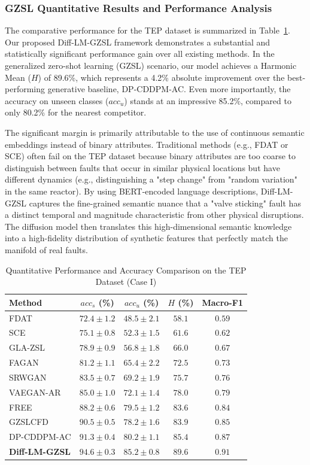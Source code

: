 \documentclass[journal]{IEEEtran}
\begin{document}
\subsubsection{GZSL Quantitative Results and Performance Analysis}
The comparative performance for the TEP dataset is summarized in Table~\ref{tab:tep_results}. Our proposed Diff-LM-GZSL framework demonstrates a substantial and statistically significant performance gain over all existing methods. In the generalized zero-shot learning (GZSL) scenario, our model achieves a Harmonic Mean ($H$) of 89.6\%, which represents a 4.2\% absolute improvement over the best-performing generative baseline, DP-CDDPM-AC. Even more importantly, the accuracy on unseen classes ($acc_u$) stands at an impressive 85.2\%, compared to only 80.2\% for the nearest competitor.

The significant margin is primarily attributable to the use of continuous semantic embeddings instead of binary attributes. Traditional methods (e.g., FDAT or SCE) often fail on the TEP dataset because binary attributes are too coarse to distinguish between faults that occur in similar physical locations but have different dynamics (e.g., distinguishing a "step change" from "random variation" in the same reactor). By using BERT-encoded language descriptions, Diff-LM-GZSL captures the fine-grained semantic nuance that a "valve sticking" fault has a distinct temporal and magnitude characteristic from other physical disruptions. The diffusion model then translates this high-dimensional semantic knowledge into a high-fidelity distribution of synthetic features that perfectly match the manifold of real faults.

\begin{table}[htbp]
\centering
\caption{Quantitative Performance and Accuracy Comparison on the TEP Dataset (Case I)}
\label{tab:tep_results}
\begin{tabular}{lcccc}
\toprule
Method & $acc_s$ (\%) & $acc_u$ (\%) & $H$ (\%) & Macro-F1 \\
\midrule
FDAT & $72.4 \pm 1.2$ & $48.5 \pm 2.1$ & $58.1$ & $0.59$ \\
SCE & $75.1 \pm 0.8$ & $52.3 \pm 1.5$ & $61.6$ & $0.62$ \\
GLA-ZSL & $78.9 \pm 0.9$ & $56.8 \pm 1.8$ & $66.0$ & $0.67$ \\
FAGAN & $81.2 \pm 1.1$ & $65.4 \pm 2.2$ & $72.5$ & $0.73$ \\
SRWGAN & $83.5 \pm 0.7$ & $69.2 \pm 1.9$ & $75.7$ & $0.76$ \\
VAEGAN-AR & $85.0 \pm 1.0$ & $72.1 \pm 1.4$ & $78.0$ & $0.79$ \\
FREE & $88.2 \pm 0.6$ & $79.5 \pm 1.2$ & $83.6$ & $0.84$ \\
GZSLCFD & $90.5 \pm 0.5$ & $78.2 \pm 1.6$ & $83.9$ & $0.85$ \\
DP-CDDPM-AC & $91.3 \pm 0.4$ & $80.2 \pm 1.1$ & $85.4$ & $0.87$ \\
\textbf{Diff-LM-GZSL} & $\mathbf{94.6 \pm 0.3}$ & $\mathbf{85.2 \pm 0.8}$ & $\mathbf{89.6}$ & $\mathbf{0.91}$ \\
\bottomrule
\end{tabular}
\end{table}
\end{document}
